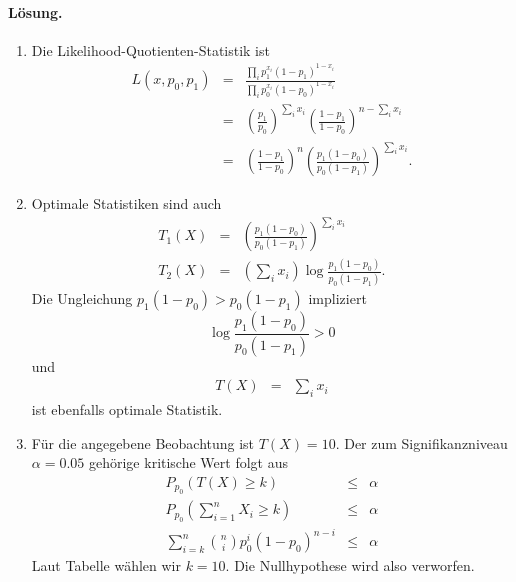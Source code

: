 \paragraph*{Lösung.}
\begin{enumerate}

    \item Die Likelihood-Quotienten-Statistik ist 
        \begin{eqnarray}
            L(x,p_0,p_1) &=& \frac{ \prod_{i} p_1^{x_i}\left( 1-p_1 \right)^{1-x_i} }{ \prod_{i} p_0^{x_i}\left( 1-p_0 \right)^{1-x_i} } \\
            &=& \left( \frac{p_1}{p_0} \right)^{\sum_{i} x_i} \left( \frac{1-p_1}{1-p_0} \right)^{n - \sum_{i} x_i} \\ 
            &=& \left( \frac{1-p_1}{1-p_0} \right)^n 
            \left( \frac{ p_1 \left( 1-p_0 \right)}{ p_0 \left( 1-p_1 \right)} \right)^{\sum_{i}^{} x_i}.
        \end{eqnarray}
    \item Optimale Statistiken sind auch
        \begin{eqnarray}
            T_1(X) &=&  \left( \frac{ p_1 \left( 1-p_0 \right)}{ p_0 \left( 1-p_1 \right)} \right)^{\sum_{i}^{} x_i} \\
            T_2(X) &=& \left( \sum_{i}^{} x_i \right) \log \frac{ p_1 \left( 1-p_0 \right)}{ p_0 \left( 1-p_1 \right)}. 
        \end{eqnarray}
        Die Ungleichung $p_1(1-p_0)> p_0(1-p_1)$ impliziert
        \begin{equation}
            \log \frac{ p_1 \left( 1-p_0 \right)}{ p_0 \left( 1-p_1 \right)} >0 
        \end{equation}
        und
        \begin{eqnarray}
            T(X) &=& \sum_{i}^{} x_i
        \end{eqnarray}
        ist ebenfalls optimale Statistik.
    \item Für die angegebene Beobachtung ist $T(X)=10$. Der zum Signifikanzniveau $\alpha=0.05$ 
        gehörige kritische Wert folgt aus
        \begin{eqnarray}
            P_{p_0} \left( T(X) \geq k \right) &\leq& \alpha \\
            P_{p_0} \left( \sum_{i=1}^{n} X_i \geq k \right) &\leq& \alpha \\
            \sum_{i=k}^{n} \binom{n}{i} p_0^i \left( 1-p_0 \right)^{n-i} & \leq & \alpha
        \end{eqnarray}
        Laut Tabelle wählen wir $k=10$. Die Nullhypothese wird also verworfen.
\end{enumerate}




